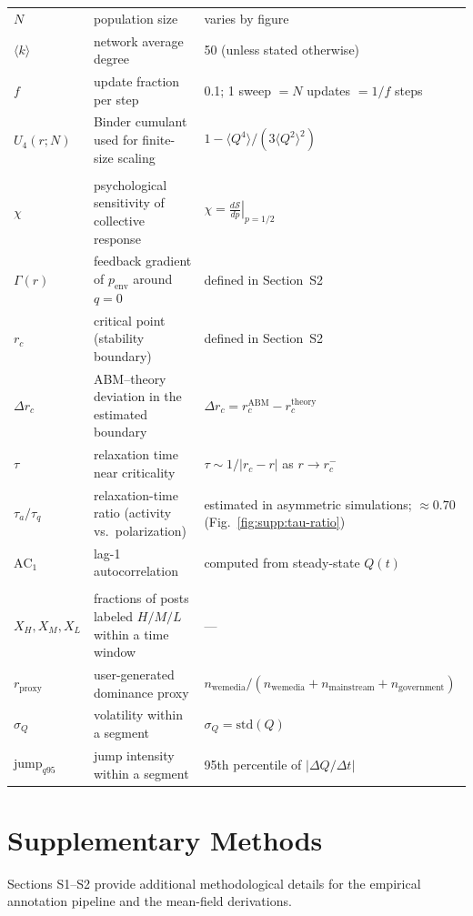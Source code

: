 \documentclass[11pt]{article}
\begin{document}
\begin{table}[H]
\begin{tabularx}{\textwidth}{@{}lYY@{}}
    $N$ & population size & varies by figure \\
    $\langle k\rangle$ & network average degree & 50 (unless stated otherwise) \\
    $f$ & update fraction per step & 0.1; 1 sweep $=N$ updates $=1/f$ steps \\
    $U_4(r;N)$ & Binder cumulant used for finite-size scaling & $1-\langle Q^4\rangle/(3\langle Q^2\rangle^2)$ \\
    \addlinespace[0.35em]
     \\
    \addlinespace[0.2em]
    $\chi$ & psychological sensitivity of collective response & $\chi=\left.\frac{d\mathcal{S}}{dp}\right|_{p=1/2}$ \\
    $\Gamma(r)$ & feedback gradient of $p_{\text{env}}$ around $q=0$ & defined in Section~S2 \\
    $r_c$ & critical point (stability boundary) & defined in Section~S2 \\
    $\Delta r_c$ & ABM--theory deviation in the estimated boundary & $\Delta r_c=r_c^{\mathrm{ABM}}-r_c^{\mathrm{theory}}$ \\
    $\tau$ & relaxation time near criticality & $\tau\sim 1/|r_c-r|$ as $r\to r_c^-$ \\
    $\tau_a/\tau_q$ & relaxation-time ratio (activity vs.\ polarization) & estimated in asymmetric simulations; $\approx 0.70$ (Fig.~\ref{fig:supp:tau-ratio}) \\
    $\mathrm{AC}_1$ & lag-1 autocorrelation & computed from steady-state $Q(t)$ \\
    \addlinespace[0.35em]
     \\
    \addlinespace[0.2em]
    $X_H,X_M,X_L$ & fractions of posts labeled $H/M/L$ within a time window & --- \\
    $r_{\text{proxy}}$ & user-generated dominance proxy &
    $n_{\text{wemedia}}/(n_{\text{wemedia}}+n_{\text{mainstream}}+n_{\text{government}})$ \\
    $\sigma_Q$ & volatility within a segment & $\sigma_Q=\mathrm{std}(Q)$ \\
    $\text{jump}_{q95}$ & jump intensity within a segment & 95th percentile of $|\Delta Q/\Delta t|$ \\
    \bottomrule
  \end{tabularx}
\end{table}
\FloatBarrier

\section*{Supplementary Methods}
\noindent Sections S1--S2 provide additional methodological details for the empirical annotation pipeline and the mean-field derivations.
\FloatBarrier
\end{document}
